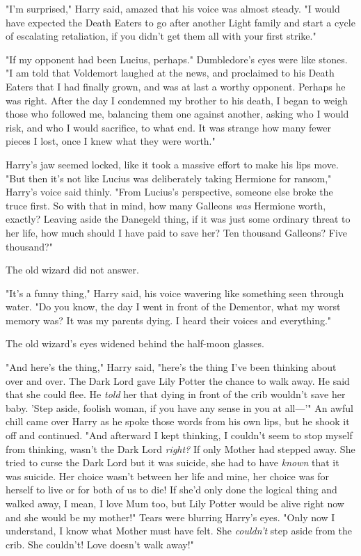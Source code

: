 "I'm surprised," Harry said, amazed that his voice was almost steady. "I would 
have expected the Death Eaters to go after another Light family and start a 
cycle of escalating retaliation, if you didn't get them all with your first 
strike."

"If my opponent had been Lucius, perhaps." Dumbledore's eyes were like stones. 
"I am told that Voldemort laughed at the news, and proclaimed to his Death 
Eaters that I had finally grown, and was at last a worthy opponent. Perhaps he 
was right. After the day I condemned my brother to his death, I began to weigh 
those who followed me, balancing them one against another, asking who I would 
risk, and who I would sacrifice, to what end. It was strange how many fewer 
pieces I lost, once I knew what they were worth."

Harry's jaw seemed locked, like it took a massive effort to make his lips move. 
"But then it's not like Lucius was deliberately taking Hermione for ransom," 
Harry's voice said thinly. "From Lucius's perspective, someone else broke the 
truce first. So with that in mind, how many Galleons \emph{was} Hermione worth, 
exactly? Leaving aside the Danegeld thing, if it was just some ordinary threat 
to her life, how much should I have paid to save her? Ten thousand Galleons? 
Five thousand?"

The old wizard did not answer.

"It's a funny thing," Harry said, his voice wavering like something seen 
through water. "Do you know, the day I went in front of the Dementor, what my 
worst memory was? It was my parents dying. I heard their voices and everything."

The old wizard's eyes widened behind the half-moon glasses.

"And here's the thing," Harry said, "here's the thing I've been thinking about 
over and over. The Dark Lord gave Lily Potter the chance to walk away. He said 
that she could flee. He \emph{told} her that dying in front of the crib 
wouldn't save her baby. 'Step aside, foolish woman, if you have any sense in 
you at all---'" An awful chill came over Harry as he spoke those words from his 
own lips, but he shook it off and continued. "And afterward I kept thinking, I 
couldn't seem to stop myself from thinking, wasn't the Dark Lord \emph{right?} 
If only Mother had stepped away. She tried to curse the Dark Lord but it was 
suicide, she had to have \emph{known} that it was suicide. Her choice wasn't 
between her life and mine, her choice was for herself to live or for both of us 
to die! If she'd only done the logical thing and walked away, I mean, I love 
Mum too, but Lily Potter would be alive right now and she would be my mother!" 
Tears were blurring Harry's eyes. "Only now I understand, I know what Mother 
must have felt. She \emph{couldn't} step aside from the crib. She couldn't! 
Love doesn't walk away!"

